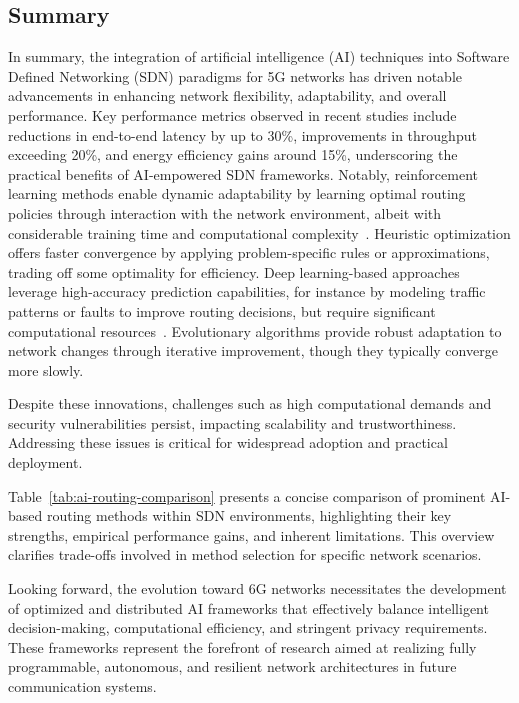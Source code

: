 \documentclass[sigconf]{acmart}
\begin{document}
\subsection{Summary}

In summary, the integration of artificial intelligence (AI) techniques into Software Defined Networking (SDN) paradigms for 5G networks has driven notable advancements in enhancing network flexibility, adaptability, and overall performance. Key performance metrics observed in recent studies include reductions in end-to-end latency by up to 30\%, improvements in throughput exceeding 20\%, and energy efficiency gains around 15\%, underscoring the practical benefits of AI-empowered SDN frameworks. Notably, reinforcement learning methods enable dynamic adaptability by learning optimal routing policies through interaction with the network environment, albeit with considerable training time and computational complexity~\cite{ref1}. Heuristic optimization offers faster convergence by applying problem-specific rules or approximations, trading off some optimality for efficiency. Deep learning-based approaches leverage high-accuracy prediction capabilities, for instance by modeling traffic patterns or faults to improve routing decisions, but require significant computational resources~\cite{ref2}. Evolutionary algorithms provide robust adaptation to network changes through iterative improvement, though they typically converge more slowly.

Despite these innovations, challenges such as high computational demands and security vulnerabilities persist, impacting scalability and trustworthiness. Addressing these issues is critical for widespread adoption and practical deployment.

Table~\ref{tab:ai-routing-comparison} presents a concise comparison of prominent AI-based routing methods within SDN environments, highlighting their key strengths, empirical performance gains, and inherent limitations. This overview clarifies trade-offs involved in method selection for specific network scenarios.

Looking forward, the evolution toward 6G networks necessitates the development of optimized and distributed AI frameworks that effectively balance intelligent decision-making, computational efficiency, and stringent privacy requirements. These frameworks represent the forefront of research aimed at realizing fully programmable, autonomous, and resilient network architectures in future communication systems.
\end{document}
